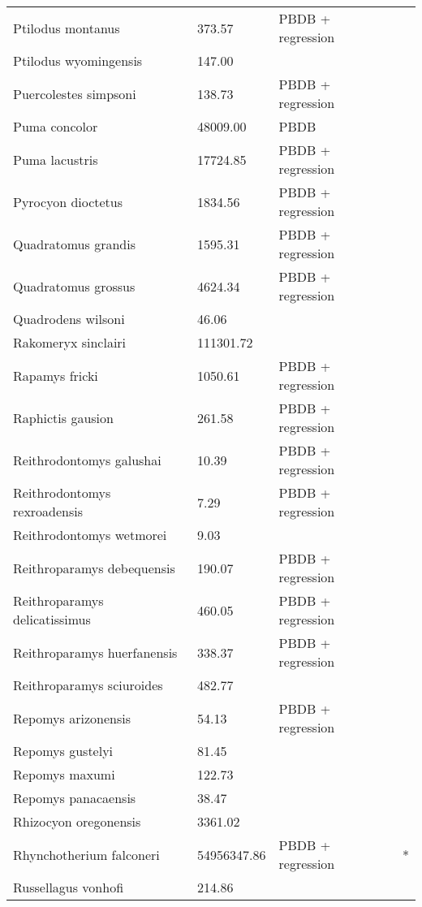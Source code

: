 \documentclass{article}
\begin{document}
\begin{center}
\begin{longtable}{p{} p{} p{} p{}}
    Ptilodus montanus & 373.57 & PBDB + regression &  \\ 
    Ptilodus wyomingensis & 147.00 & \cite{Wilson2012} &  \\ 
    Puercolestes simpsoni & 138.73 & PBDB + regression &  \\ 
    Puma concolor & 48009.00 & PBDB &  \\ 
    Puma lacustris & 17724.85 & PBDB + regression &  \\ 
    Pyrocyon dioctetus & 1834.56 & PBDB + regression &  \\ 
    Quadratomus grandis & 1595.31 & PBDB + regression &  \\ 
    Quadratomus grossus & 4624.34 & PBDB + regression &  \\ 
    Quadrodens wilsoni & 46.06 & \cite{Tomiya2013} &  \\ 
    Rakomeryx sinclairi & 111301.72 & \cite{Tomiya2013} &  \\ 
    Rapamys fricki & 1050.61 & PBDB + regression &  \\ 
    Raphictis gausion & 261.58 & PBDB + regression &  \\ 
    Reithrodontomys galushai & 10.39 & PBDB + regression &  \\ 
    Reithrodontomys rexroadensis & 7.29 & PBDB + regression &  \\ 
    Reithrodontomys wetmorei & 9.03 & \cite{Tomiya2013} &  \\ 
    Reithroparamys debequensis & 190.07 & PBDB + regression &  \\ 
    Reithroparamys delicatissimus & 460.05 & PBDB + regression &  \\ 
    Reithroparamys huerfanensis & 338.37 & PBDB + regression &  \\ 
    Reithroparamys sciuroides & 482.77 & \cite{Wang1994a} &  \\ 
    Repomys arizonensis & 54.13 & PBDB + regression &  \\ 
    Repomys gustelyi & 81.45 & \cite{Tomiya2013} &  \\ 
    Repomys maxumi & 122.73 & \cite{Tomiya2013} &  \\ 
    Repomys panacaensis & 38.47 & \cite{Tomiya2013} &  \\ 
    Rhizocyon oregonensis & 3361.02 & \cite{Tomiya2013} &  \\ 
    Rhynchotherium falconeri & 54956347.86 & PBDB + regression & * \\ 
    Russellagus vonhofi & 214.86 & \cite{Tomiya2013} &  \\ 

\end{longtable}
\end{center}
\end{document}
